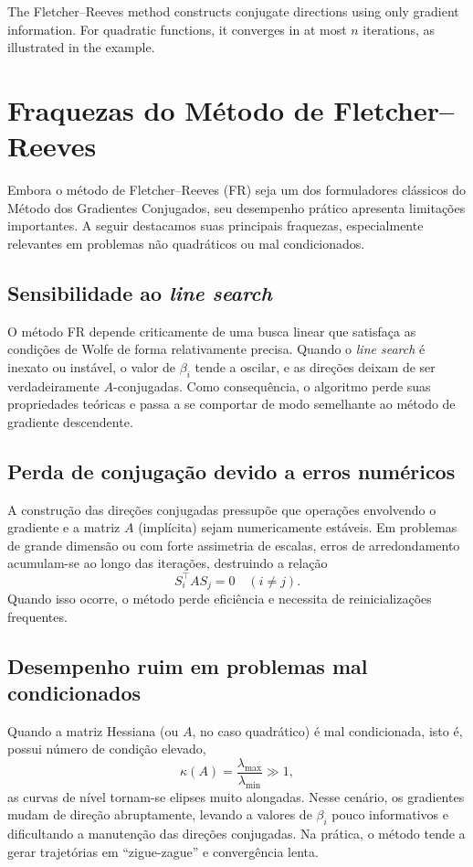 \documentclass[9pt,a4paper]{extarticle}
\begin{document}
The Fletcher--Reeves method constructs conjugate directions using only gradient information. For quadratic functions, it converges in at most $n$ iterations, as illustrated in the example.

\section{Fraquezas do Método de Fletcher--Reeves}

Embora o método de Fletcher--Reeves (FR) seja um dos formuladores clássicos do Método dos Gradientes Conjugados, seu desempenho prático apresenta limitações importantes. A seguir destacamos suas principais fraquezas, especialmente relevantes em problemas não quadráticos ou mal condicionados.

\subsection*{Sensibilidade ao \textit{line search}}

O método FR depende criticamente de uma busca linear que satisfaça as condições de Wolfe de forma relativamente precisa. Quando o \textit{line search} é inexato ou instável, o valor de $\beta_i$ tende a oscilar, e as direções deixam de ser verdadeiramente $A$-conjugadas. Como consequência, o algoritmo perde suas propriedades teóricas e passa a se comportar de modo semelhante ao método de gradiente descendente.

\subsection*{Perda de conjugação devido a erros numéricos}

A construção das direções conjugadas pressupõe que operações envolvendo o gradiente e a matriz $A$ (implícita) sejam numericamente estáveis. Em problemas de grande dimensão ou com forte assimetria de escalas, erros de arredondamento acumulam-se ao longo das iterações, destruindo a relação
\[
S_i^\top A S_j = 0 \quad (i \neq j).
\]
Quando isso ocorre, o método perde eficiência e necessita de reinicializações frequentes.

\subsection*{Desempenho ruim em problemas mal condicionados}

Quando a matriz Hessiana (ou $A$, no caso quadrático) é mal condicionada, isto é, possui número de condição elevado,
\[
\kappa(A) = \frac{\lambda_{\max}}{\lambda_{\min}} \gg 1,
\]
as curvas de nível tornam-se elipses muito alongadas. Nesse cenário, os gradientes mudam de direção abruptamente, levando a valores de $\beta_i$ pouco informativos e dificultando a manutenção das direções conjugadas. Na prática, o método tende a gerar trajetórias em ``zigue-zague'' e convergência lenta.
\end{document}
